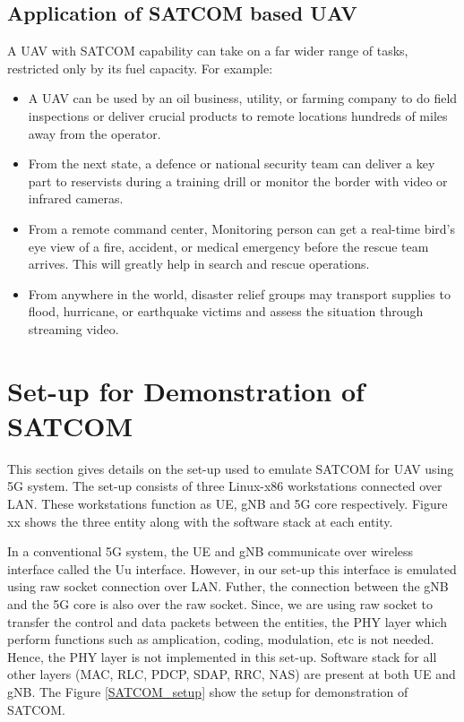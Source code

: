 \subsection{Application of SATCOM based UAV}
A UAV with SATCOM capability can take on a far wider range of tasks, restricted only by its fuel capacity. For example: 
\begin{itemize}
	\item A UAV can be used by an oil business, utility, or farming company to do field inspections or deliver crucial products to remote locations hundreds of miles away from the operator. 
	\item From the next state, a defence or national security team can deliver a key part to reservists during a training drill or monitor the border with video or infrared cameras.
	\item From a remote command center, Monitoring person can get a real-time bird's eye view of a fire, accident, or medical emergency before the rescue team arrives. This will greatly help in search and rescue operations.
	\item From anywhere in the world, disaster relief groups may transport supplies to flood, hurricane, or earthquake victims and assess the situation through streaming video.
\end{itemize}

\newpage
\section{Set-up for Demonstration of SATCOM}
This section gives details on the set-up used to emulate SATCOM for UAV using 5G system. The set-up consists of three Linux-x86 workstations connected over LAN. These workstations function as UE, gNB and 5G core respectively. Figure xx shows the three entity along with the software stack at each entity.



In a conventional 5G system, the UE and gNB  communicate over wireless interface called the Uu interface. However, in our set-up this interface is emulated using raw socket connection over LAN. Futher, the connection between the gNB and the 5G core is also over the raw socket. Since, we are using raw socket to transfer the control and data packets between the entities, the PHY layer which perform functions such as amplication, coding, modulation, etc is not needed. Hence, the PHY layer is not implemented in this set-up. Software stack for all other layers (MAC, RLC, PDCP, SDAP, RRC, NAS) are present at both UE and gNB. The Figure \ref{SATCOM_setup} show the setup for demonstration of SATCOM.

